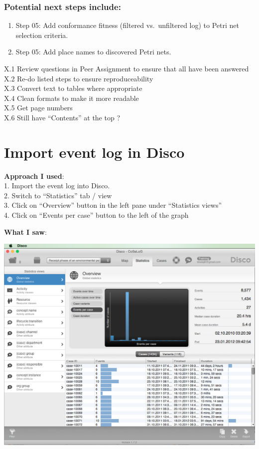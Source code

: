 \documentclass[]{article}
\begin{document}
\subsubsection{Potential next steps
include:}\label{potential-next-steps-include}

\begin{enumerate}
\def\labelenumi{\arabic{enumi}.}
\itemsep1pt\parskip0pt
\item
  Step 05: Add conformance fitness (filtered vs.~unfiltered log) to
  Petri net selection criteria.
\item
  Step 05: Add place names to discovered Petri nets.
\end{enumerate}

X.1 Review questions in Peer Assignment to ensure that all have been
answered\\X.2 Re-do listed steps to ensure reproduceability\\X.3 Convert
text to tables where appropriate\\X.4 Clean formats to make it more
readable\\X.5 Get page numbers\\X.6 Still have ``Contents'' at the top ?

\section{Import event log in Disco}\label{import-event-log-in-disco}

\textbf{Approach I used}:\\1. Import the event log into Disco.\\2.
Switch to ``Statistics'' tab / view\\3. Click on ``Overview'' button in
the left pane under ``Statistics views''\\4. Click on ``Events per
case'' button to the left of the graph

\textbf{What I saw}:

\includegraphics{CoSeLoG_Step_01_Q_01.png}
\end{document}
